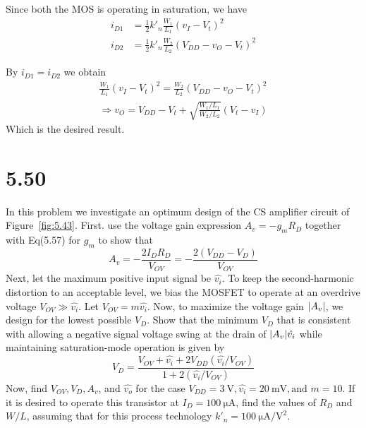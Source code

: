 \documentclass[12pt, a4paper]{article}
\begin{document}
\Ans
Since both the MOS is operating in saturation, we have
\begin{align*}
  i_{D1} &= \frac{1}{2} k'_n \frac{W_1}{L_1} (v_I - V_t)^2 \\
  i_{D2} &= \frac{1}{2} k'_n \frac{W_2}{L_2} (V_{DD} - v_O - V_t)^2 
\end{align*}

By $i_{D1} = i_{D2}$ we obtain
\begin{gather*}
  \frac{W_1}{L_1} (v_I - V_t)^2 = \frac{W_2}{L_2} (V_{DD} - v_O - V_t)^2 \\
  \Rightarrow v_O = V_{DD} - V_t + \sqrt{ \frac{W_1/L_1}{W_2/L_2} } (V_t - v_I) 
\end{gather*}
Which is the desired result.

\section{5.50}
In this problem we investigate an optimum design of the CS amplifier circuit of Figure~\ref{fig:5.43}. First. use the voltage gain expression $A_v = -g_m R_D$ together with Eq(5.57) for $g_m$ to show that
\[ A_v = -\frac{2I_D R_D}{V_{OV}} = - \frac{2(V_{DD} - V_D)}{V_{OV}} \]
Next, let the maximum positive input signal be $\hat{v_i}$. To keep the second-harmonic distortion to an acceptable level, we bias the MOSFET to operate at an overdrive voltage $V_{OV} \gg \hat{v_i}$. Let $V_{OV} = m\hat{v_i}$. Now, to maximize the voltage gain $\lvert A_v\rvert$, we design for the lowest possible $V_D$. Show that the minimum $V_D$ that is consistent with allowing a negative signal voltage swing at the drain of $\lvert A_v\rvert\hat{v_i}$ while maintaining saturation-mode operation is given by
\[
  V_D = \frac{V_{OV} + \hat{v_i} + 2 V_{DD} (\hat{v_i}/V_{OV})}{1 + 2(\hat{v_i}/V_{OV})} 
\]
Now, find $V_{OV}, V_D, A_v$, and $\hat{v_o}$ for the case $V_{DD} = \SI{3}{\V}, \hat{v_i} = \SI{20}{\mV}, \text{and } m = 10$. If it is desired to operate this transistor at $I_D = \SI{100}{\uA}$, find the values of $R_D$ and $W/L$, assuming that for this process technology $k'_n = \SI{100}{\uA\per\V\squared}$.
\end{document}
